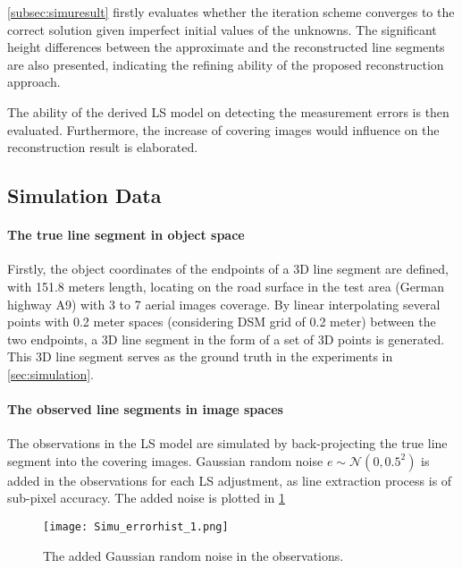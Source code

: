 \cref{subsec:simuresult} firstly evaluates whether the iteration scheme converges to the correct solution given imperfect initial values of the unknowns. The significant height differences between the approximate and the reconstructed line segments are also presented, indicating the refining ability of the proposed reconstruction approach.

The ability of the derived LS model on detecting the measurement errors is then evaluated. Furthermore, the increase of covering images would influence on the reconstruction result is elaborated.





\subsection{Simulation Data}
\label{subsec:simudata}

\paragraph{The true line segment in object space}
Firstly, the object coordinates of the endpoints of a 3D line segment are defined, with 151.8 meters length, locating on the road surface in the test area (German highway A9) with 3 to 7 aerial images coverage. By linear interpolating several points with 0.2 meter spaces (considering DSM grid of 0.2 meter) between the two endpoints, a 3D line segment in the form of a set of 3D points is generated. This 3D line segment serves as the ground truth in the experiments in \cref{sec:simulation}. 

\paragraph{The observed line segments in image spaces}
The observations in the LS model are simulated by back-projecting the true line segment into the covering images. Gaussian random noise $e\sim\mathcal{N}(0,0.5^2)$ is added in the observations for each LS adjustment, as line extraction process is of sub-pixel accuracy. The added noise is plotted in \cref{fig:noise}

\begin{figure}
  \centering
  \texttt{[image: Simu\_errorhist\_1.png]}
  \caption{\small The added Gaussian random noise in the observations.}
  \label{fig:noise}
\end{figure}

